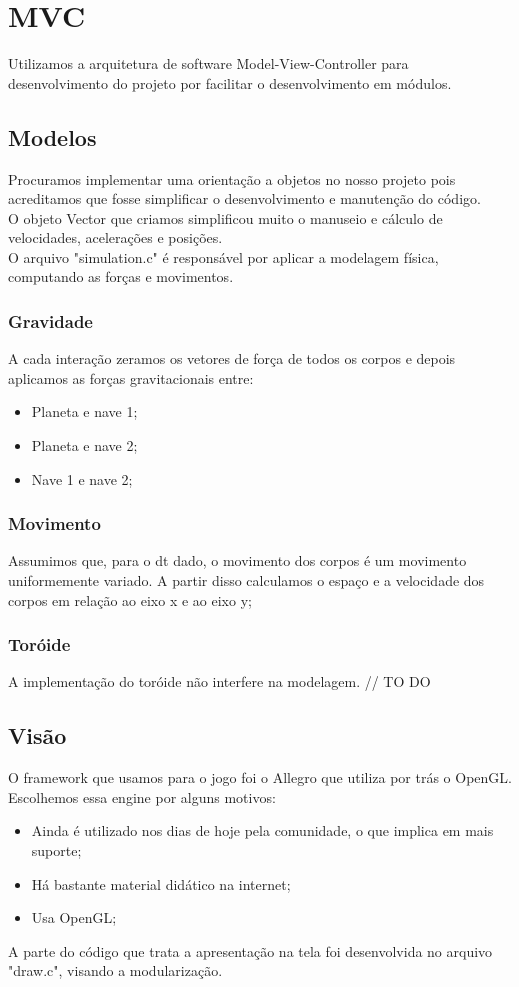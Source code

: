 \documentclass{article}
\begin{document}
\section{MVC}
Utilizamos a arquitetura de software Model-View-Controller para desenvolvimento do projeto por facilitar o desenvolvimento em módulos.

\subsection{Modelos}
Procuramos implementar uma orientação a objetos no nosso projeto pois acreditamos que fosse simplificar o desenvolvimento e manutenção do
código. \\
O objeto Vector que criamos simplificou muito o manuseio e cálculo de velocidades, acelerações e posições. \\
O arquivo "simulation.c" é responsável por aplicar a modelagem física, computando as forças e movimentos.

\subsubsection{Gravidade}
A cada interação zeramos os vetores de força de todos os corpos e depois aplicamos as forças gravitacionais entre:
\begin{itemize}
\item Planeta e nave 1;
\item Planeta e nave 2;
\item Nave 1 e nave 2;
\end{itemize}

\subsubsection{Movimento}
Assumimos que, para o dt dado, o movimento dos corpos é um movimento uniformemente variado. A partir disso calculamos o espaço e a velocidade dos corpos em relação ao eixo x e ao eixo y;

\subsubsection{Toróide}
A implementação do toróide não interfere na modelagem. // TO DO

\subsection{Visão}
O framework que usamos para o jogo foi o Allegro que utiliza por trás o OpenGL. Escolhemos essa engine por alguns motivos: \\
\begin{itemize}
    \item Ainda é utilizado nos dias de hoje pela comunidade, o que implica em mais suporte;
    \item Há bastante material didático na internet;
    \item Usa OpenGL;
\end{itemize}
A parte do código que trata a apresentação na tela foi desenvolvida no arquivo "draw.c", visando a modularização.
\end{document}
